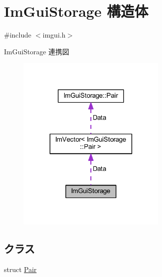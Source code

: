 \hypertarget{struct_im_gui_storage}{}\section{Im\+Gui\+Storage 構造体}
\label{struct_im_gui_storage}


{\ttfamily \#include $<$imgui.\+h$>$}



Im\+Gui\+Storage 連携図\nopagebreak
\begin{figure}[H]
\begin{center}
\leavevmode
\includegraphics[width=204pt]{struct_im_gui_storage__coll__graph}
\end{center}
\end{figure}
\subsection*{クラス}
\begin{DoxyCompactItemize}
\item 
struct \mbox{\hyperlink{struct_im_gui_storage_1_1_pair}{Pair}}
\end{DoxyCompactItemize}
